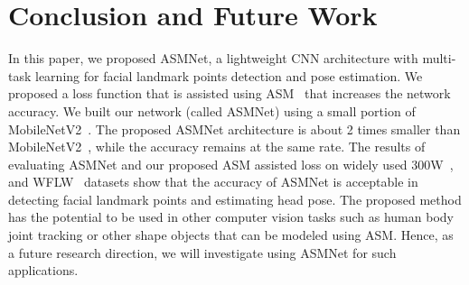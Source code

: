 \documentclass[final]{cvpr}
\begin{document}
\section{Conclusion and Future Work}
\label{sec:conclusion}
In this paper, we proposed ASMNet, a lightweight CNN architecture with multi-task learning for facial landmark points detection and pose estimation. We proposed a loss function that is assisted using ASM~\cite{cootes1995active, ordas2003active} that increases the network accuracy. We built our network (called ASMNet) using a small portion of MobileNetV2~\cite{sandler2018mobilenetv2}. The proposed ASMNet architecture is about 2 times smaller than MobileNetV2~\cite{sandler2018mobilenetv2}, while the accuracy remains at the same rate. The results of evaluating ASMNet and our proposed ASM assisted loss on widely used 300W~\cite{sagonas2013300}, and WFLW~\cite{wu2018look} datasets show that the accuracy of ASMNet is acceptable in detecting facial landmark points and estimating head pose. The proposed method has the potential to be used in other computer vision tasks such as human body joint tracking or other shape objects that can be modeled using ASM. Hence, as a future research direction, we will investigate using ASMNet for such applications.

{\small


}
\end{document}
